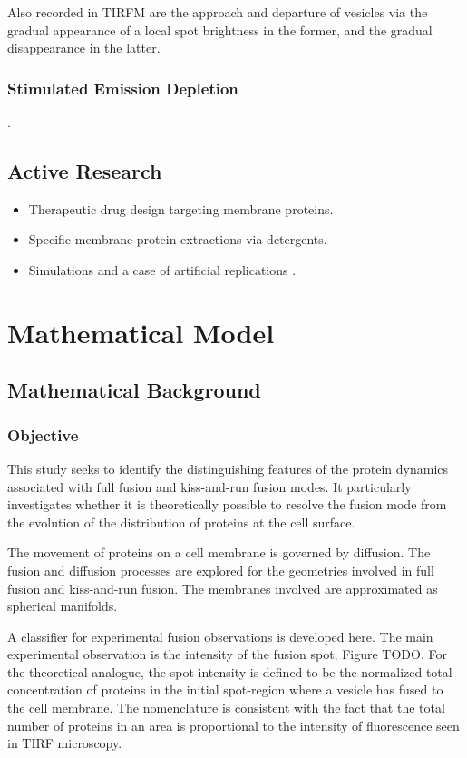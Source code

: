 \documentclass{report}
\begin{document}
Also recorded in TIRFM are the approach and departure of vesicles via the gradual appearance of a local spot brightness in the former, and the gradual disappearance in the latter.

\section{Stimulated Emission Depletion}
\cite{willig2006sted}.

\chapter{Active Research}
\begin{itemize}
	\item Therapeutic drug design targeting membrane proteins.
	\item Specific membrane protein extractions via detergents.
	\item Simulations \cite{marrink2019computational} and a case of artificial replications \cite{de2006controlled}.
\end{itemize}

\part{Mathematical Model}

\chapter{Mathematical Background}
\section{Objective}
This study seeks to identify the distinguishing features of the protein dynamics associated with full fusion and kiss-and-run fusion modes. It particularly investigates whether it is theoretically possible to resolve the fusion mode from the evolution of the distribution of proteins at the cell surface.

The movement of proteins on a cell membrane is governed by diffusion. The fusion and diffusion processes are explored for the geometries involved in full fusion and kiss-and-run fusion. The membranes involved are approximated as spherical manifolds.

A classifier for experimental fusion observations is developed here. The main experimental observation is the intensity of the fusion spot, Figure TODO. For the theoretical analogue, the spot intensity is defined to be the normalized total concentration of proteins in the initial spot-region where a vesicle has fused to the cell membrane. The nomenclature is consistent with the fact that the total number of proteins in an area is proportional to the intensity of fluorescence seen in TIRF microscopy.
\end{document}
